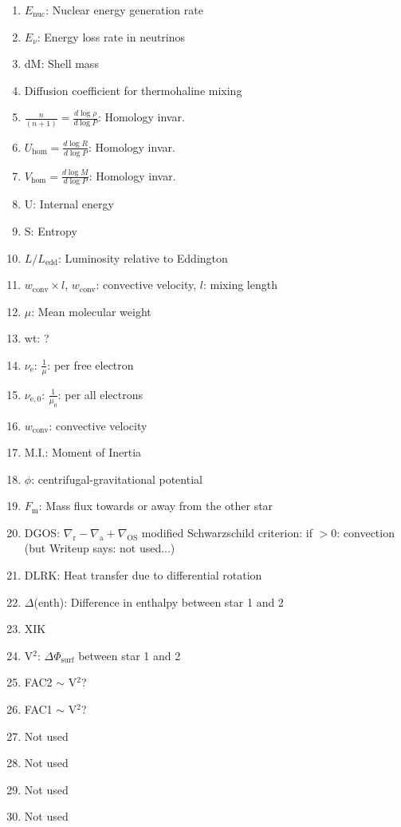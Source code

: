 \begin{enumerate}
\item $E_\mathrm{nuc}$: Nuclear energy generation rate
\item $E_\nu$: Energy loss rate in neutrinos 
\item dM: Shell mass
\item Diffusion coefficient for thermohaline mixing
\item $\frac{n}{(n+1)} = \frac{d\log\rho}{d\log P}$: Homology invar.
\item $U_\mathrm{hom} = \frac{d\log R}{d\log P}$: Homology invar.
\item $V_\mathrm{hom} = \frac{d\log M}{d\log P}$: Homology invar.
\item U: Internal energy 
\item S: Entropy
\item $L/L_\mathrm{edd}$: Luminosity relative to Eddington

\item $w_\mathrm{conv} \times l$, $w_\mathrm{conv}$: convective velocity, $l$: mixing length
\item $\mu$: Mean molecular weight
\item wt: ? 
\item $\nu_\mathrm{e}$: $\frac{1}{\mu}$: per free electron
\item $\nu_\mathrm{e,0}$: $\frac{1}{\mu_0}$: per all electrons
\item $w_\mathrm{conv}$: convective velocity
\item M.I.: Moment of Inertia
\item $\phi$: centrifugal-gravitational potential
\item $F_\mathrm{m}$: Mass flux towards or away from the other star
\item DGOS: $\nabla_\mathrm{r} - \nabla_\mathrm{a} + \nabla_\mathrm{OS}$ modified Schwarzschild criterion: if $>0$: convection  (but Writeup says: not used...)

\item DLRK: Heat transfer due to differential rotation
\item $\Delta$(enth): Difference in enthalpy between star 1 and 2
\item XIK
\item V$^2$: $\Delta\Phi_\mathrm{surf}$ between star 1 and 2
\item FAC2  $\sim$ V$^2$?
\item FAC1  $\sim$ V$^2$?
\item Not used
\item Not used
\item Not used
\item Not used


\end{enumerate}
